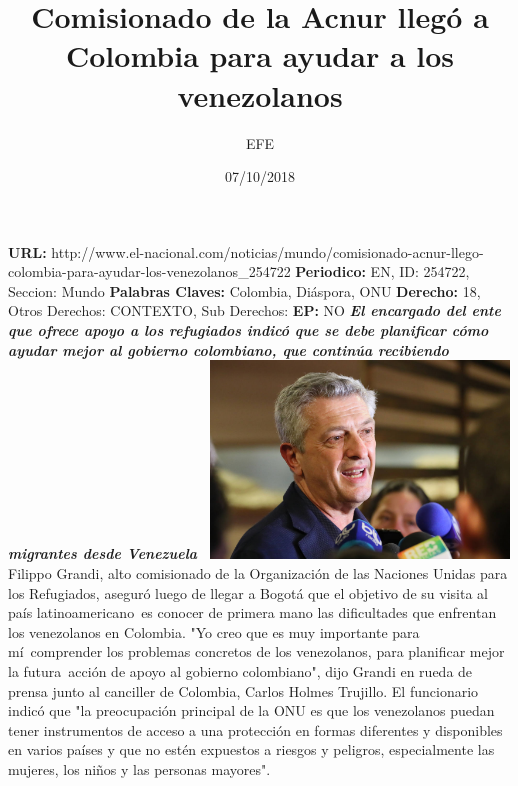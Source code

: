 \documentclass{article}%
\title{\textbf{Comisionado de la Acnur llegó a Colombia para ayudar a los venezolanos}}%
\author{EFE}%
\date{07/10/2018}%
\begin{document}
%
\normalsize%
\maketitle%
\textbf{URL: }%
http://www.el{-}nacional.com/noticias/mundo/comisionado{-}acnur{-}llego{-}colombia{-}para{-}ayudar{-}los{-}venezolanos\_254722\newline%
%
\textbf{Periodico: }%
EN, %
ID: %
254722, %
Seccion: %
Mundo\newline%
%
\textbf{Palabras Claves: }%
Colombia, Diáspora, ONU\newline%
%
\textbf{Derecho: }%
18, %
Otros Derechos: %
CONTEXTO, %
Sub Derechos: %
\newline%
%
\textbf{EP: }%
NO\newline%
\newline%
%
\textbf{\textit{El encargado del ente que ofrece apoyo a los refugiados indicó que se debe planificar cómo ayudar mejor al gobierno colombiano, que continúa recibiendo migrantes desde Venezuela~}}%
\newline%
\newline%
%
\includegraphics[width=300px]{185.jpg}%
\newline%
%
Filippo Grandi, alto comisionado de la Organización de las Naciones Unidas para los Refugiados, aseguró luego de llegar a Bogotá que el objetivo de su visita al país latinoamericano~es conocer de primera mano las dificultades que enfrentan los venezolanos en Colombia.%
\newline%
%
"Yo creo que es muy importante para mí~comprender los problemas concretos de los venezolanos, para planificar mejor la futura~acción de apoyo al gobierno colombiano", dijo Grandi en rueda de prensa junto al canciller de Colombia, Carlos Holmes Trujillo.%
\newline%
%
El funcionario indicó que "la preocupación principal de la ONU es que los venezolanos puedan tener instrumentos de acceso a una protección en formas diferentes y disponibles en varios países y que no estén expuestos a riesgos y peligros, especialmente las mujeres, los niños y las personas mayores".%
\end{document}

